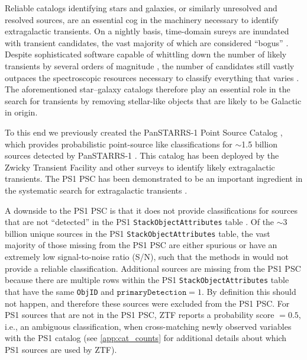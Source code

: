 \documentclass[twocolumn]{aastex63}
\begin{document}
Reliable catalogs identifying stars and galaxies, or similarly unresolved and
resolved sources, are an essential cog in the machinery necessary to identify
extragalactic transients. On a nightly basis, time-domain sureys are inundated
with transient candidates, the vast majority of which are considered ``bogus''
\citep[e.g.,][]{Bloom12}. Despite sophisticated software capable of whittling
down the number of likely transients by several orders of magnitude
\citep[e.g.,][]{Brink13,Goldstein15,Duev19,Smith20}, the number of candidates
still vastly outpaces the spectroscopic resources necessary to classify
everything that varies \citep[e.g.,][]{Kulkarni20}. The aforementioned
star--galaxy catalogs therefore play an essential role in the search for
transients by removing stellar-like objects that are likely to be Galactic in
origin.

To this end we previously created the PanSTARRS-1 Point Source Catalog
\citep[PS1 PSC;][]{Tachibana18}, which provides probabilistic point-source like
classifications for $\sim$1.5 billion sources detected by PanSTARRS-1
\citep[PS1;][]{Chambers16}. This catalog has been deployed by the Zwicky
Transient Facility \citep[ZTF;][]{Bellm19} and other surveys
\citep{Smith20,Moller20} to identify likely extragalactic transients. The PS1
PSC has been demonstrated to be an important ingredient in the systematic
search for extragalactic transients \citep[e.g.,][]{Fremling20,De20}.

A downside to the PS1 PSC is that it does not provide classifications for
sources that are not ``detected'' in the PS1 \texttt{StackObjectAttributes}
table \citep[see \S3 in][]{Tachibana18}. Of the $\sim$3 billion unique sources
in the PS1 \texttt{StackObjectAttributes} table, the vast majority of those
missing from the PS1 PSC are either spurious or have an extremely low
signal-to-noise ratio (S/N), such that the methods in \citet{Tachibana18}
would not provide a reliable classification. Additional sources are missing
from the PS1 PSC because there are multiple rows within the PS1
\texttt{StackObjectAttributes} table that have the same \texttt{ObjID} and
$\mathtt{primaryDetection} = 1$. By definition this should not happen, and
therefore these sources were excluded from the PS1 PSC. For PS1 sources that
are not in the PS1 PSC, ZTF reports a probability score $=0.5$, i.e., an
ambiguous classification, when cross-matching newly observed variables with
the PS1 catalog (see \ref{app:cat_counts} for additional details about which
PS1 sources are used by ZTF).
\end{document}
